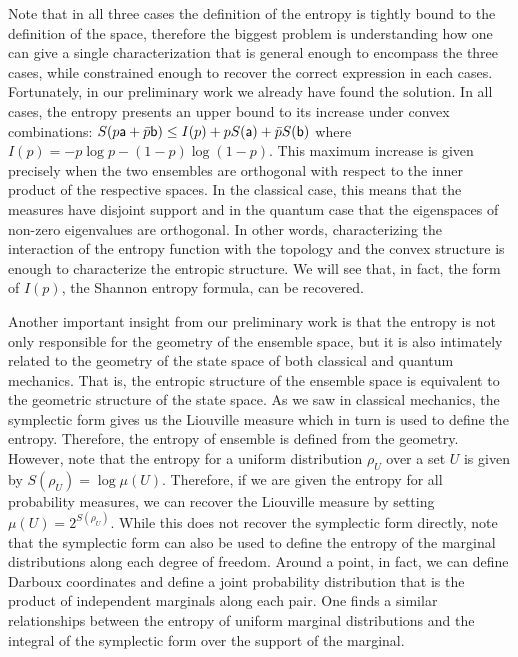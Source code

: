 Note that in all three cases the definition of the entropy is tightly bound to the definition of the space, therefore the biggest problem is understanding how one can give a single characterization that is general enough to encompass the three cases, while constrained enough to recover the correct expression in each cases. Fortunately, in our preliminary work we already have found the solution. In all cases, the entropy presents an upper bound to its increase under convex combinations: $S(p\ens[a] + \bar{p} \ens[b]) \leq I(p) + p S(\ens[a]) + \bar{p} S(\ens[b])$ where $I(p) = -p \log p - (1-p) \log (1-p)$. This maximum increase is given precisely when the two ensembles are orthogonal with respect to the inner product of the respective spaces. In the classical case, this means that the measures have disjoint support and in the quantum case that the eigenspaces of non-zero eigenvalues are orthogonal. In other words, characterizing the interaction of the entropy function with the topology and the convex structure is enough to characterize the entropic structure. We will see that, in fact, the form of $I(p)$, the Shannon entropy formula, can be recovered.

Another important insight from our preliminary work is that the entropy is not only responsible for the geometry of the ensemble space, but it is also intimately related to the geometry of the state space of both classical and quantum mechanics. That is, the entropic structure of the ensemble space is equivalent to the geometric structure of the state space. As we saw in classical mechanics, the symplectic form gives us the Liouville measure which in turn is used to define the entropy. Therefore, the entropy of ensemble is defined from the geometry. However, note that the entropy for a uniform distribution $\rho_U$ over a set $U$ is given by $S(\rho_U) = \log \mu(U)$. Therefore, if we are given the entropy for all probability measures, we can recover the Liouville measure by setting $\mu(U) = 2^{S(\rho_U)}$. While this does not recover the symplectic form directly, note that the symplectic form can also be used to define the entropy of the marginal distributions along each degree of freedom. Around a point, in fact, we can define Darboux coordinates and define a joint probability distribution that is the product of independent marginals along each pair. One finds a similar relationships between the entropy of uniform marginal distributions and the integral of the symplectic form over the support of the marginal.

